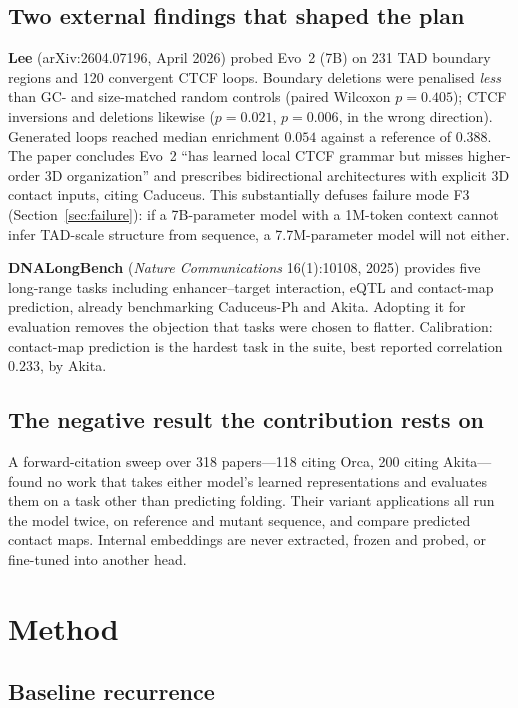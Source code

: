 \documentclass[11pt,a4paper]{article}
\begin{document}
\subsection{Two external findings that shaped the plan}

\textbf{Lee} (arXiv:2604.07196, April 2026) probed Evo~2 (7B) on 231 TAD boundary
regions and 120 convergent CTCF loops. Boundary deletions were penalised
\emph{less} than GC- and size-matched random controls (paired Wilcoxon
$p=0.405$); CTCF inversions and deletions likewise ($p=0.021$, $p=0.006$, in the
wrong direction). Generated loops reached median enrichment $0.054$ against a
reference of $0.388$. The paper concludes Evo~2 ``has learned local CTCF grammar
but misses higher-order 3D organization'' and prescribes bidirectional
architectures with explicit 3D contact inputs, citing Caduceus. This
substantially defuses failure mode F3 (Section~\ref{sec:failure}): if a
7B-parameter model with a 1M-token context cannot infer TAD-scale structure from
sequence, a 7.7M-parameter model will not either.

\textbf{DNALongBench} (\emph{Nature Communications} 16(1):10108, 2025) provides
five long-range tasks including enhancer--target interaction, eQTL and
contact-map prediction, already benchmarking Caduceus-Ph and Akita. Adopting it
for evaluation removes the objection that tasks were chosen to flatter.
Calibration: contact-map prediction is the hardest task in the suite, best
reported correlation $0.233$, by Akita.

\subsection{The negative result the contribution rests on}

A forward-citation sweep over 318 papers---118 citing Orca, 200 citing
Akita---found no work that takes either model's learned representations and
evaluates them on a task other than predicting folding. Their variant
applications all run the model twice, on reference and mutant sequence, and
compare predicted contact maps. Internal embeddings are never extracted, frozen
and probed, or fine-tuned into another head.

\section{Method}

\subsection{Baseline recurrence}
\end{document}
